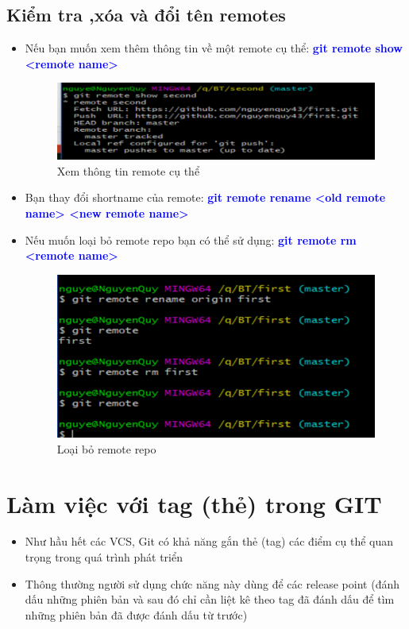 \documentclass[12pt,a4paper]{report}
\begin{document}
\subsection{Kiểm tra ,xóa và đổi tên remotes} 
\begin{itemize}
\item Nếu bạn muốn xem thêm thông tin về một remote cụ thể: \textcolor{blue}{\bf git remote show <remote name>}

\begin{figure}[!ht]
	\centering	
	\includegraphics[width=0.8\linewidth]{screenshot040}
\caption{Xem thông tin remote cụ thể}
	\label{fig:screenshot040}
	\end{figure}

\item Bạn thay đổi shortname của remote: \textcolor{blue}{\bf git remote rename <old remote name> <new remote name>}
\item Nếu muốn loại bỏ remote repo  bạn có thể sử dụng: \textcolor{blue}{\bf git remote rm <remote name> }

\begin{figure}[!ht]
	\centering
	\includegraphics[width=0.8\linewidth]{screenshot041}
\caption{Loại bỏ remote repo}
	\label{fig:screenshot041}
	\end{figure}
\end{itemize}

			
\section{Làm việc với tag (thẻ) trong GIT}
\begin{itemize}
\item Như hầu hết các VCS, Git có khả năng gắn thẻ (tag) các điểm cụ thể quan trọng trong quá trình phát triển
\item Thông thường người sử dụng chức năng này dùng để các release point (đánh dấu những phiên bản và sau đó chỉ cần liệt kê theo tag đã đánh dấu để tìm những phiên bản đã được đánh dấu từ trước)
\end{itemize}
\end{document}
